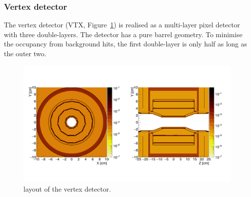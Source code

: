 \subsubsection*{\bf Vertex detector}

The vertex detector (VTX, Figure~\ref{fig:det:vertex}) is realised as a multi-layer pixel detector with three double-layers. The detector has a pure barrel geometry. To minimise the occupancy from background hits,
the first double-layer is only half as long as the outer two. 



\begin{figure}[t!]
\centering
\includegraphics[width=0.8\hsize]{Detector/fig/vertex.png}
\caption{layout of the vertex detector.}
\label{fig:det:vertex}
\end{figure}

